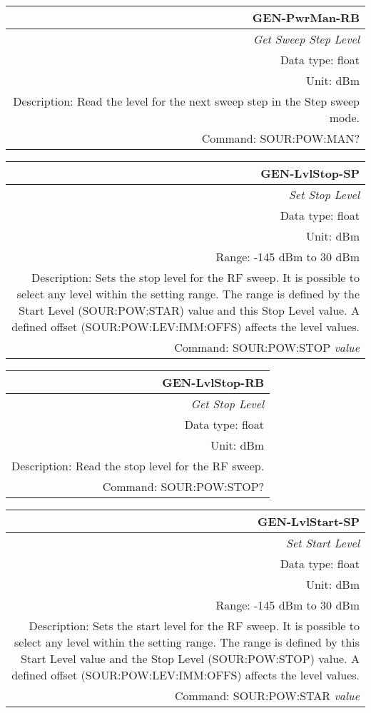 \documentclass[openany]{article}
\begin{document}
		\begin{tabular}{N}
			\hline
			\bfseries GEN-PwrMan-RB \\ \hline
			\emph{Get Sweep Step Level} \\
			Data type: float \\
			Unit: dBm \\
			Description: Read the level for the next sweep step in the Step sweep mode. \\
			Command: SOUR:POW:MAN? \\

		\end{tabular}
%
		\begin{tabular}{N}
			\hline
			\bfseries GEN-LvlStop-SP \\ \hline
			\emph{Set Stop Level} \\
			Data type: float \\
			Unit: dBm \\
			Range: -145 dBm to 30 dBm \\
			Description: Sets the stop level for the RF sweep. It is possible to select any level within the setting range. The range is defined by the Start Level (SOUR:POW:STAR) value and this Stop Level value. A defined offset (SOUR:POW:LEV:IMM:OFFS) affects the level values. \\
			Command: SOUR:POW:STOP \emph{value} \\

		\end{tabular}


		\begin{tabular}{N}
			\hline
			\bfseries GEN-LvlStop-RB \\ \hline
			\emph{Get Stop Level} \\
			Data type: float \\
			Unit: dBm \\
			Description: Read the stop level for the RF sweep. \\
			Command: SOUR:POW:STOP? \\

		\end{tabular}
%
		\begin{tabular}{N}
			\hline
			\bfseries GEN-LvlStart-SP \\ \hline
			\emph{Set Start Level} \\
			Data type: float \\
			Unit: dBm \\
			Range: -145 dBm to 30 dBm \\
			Description: Sets the start level for the RF sweep. It is possible to select any level within the setting range. The range is defined by this Start Level value and the Stop Level (SOUR:POW:STOP) value. A defined offset (SOUR:POW:LEV:IMM:OFFS) affects the level values. \\
			Command: SOUR:POW:STAR \emph{value} \\

		\end{tabular}
\end{document}

